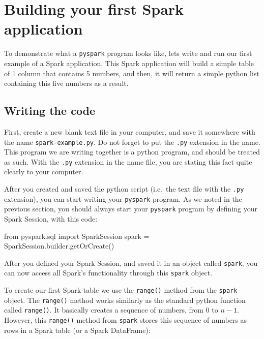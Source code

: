 \documentclass[
  11pt,
  letterpaper,
  DIV=11,
  numbers=noendperiod]{scrreprt}
\newenvironment{Shaded}{\begin{snugshade}}{\end{snugshade}}
\newcommand{\ImportTok}[1]{\textcolor[rgb]{0.00,0.46,0.62}{#1}}
\newcommand{\NormalTok}[1]{\textcolor[rgb]{0.00,0.23,0.31}{#1}}
\newcommand{\OperatorTok}[1]{\textcolor[rgb]{0.37,0.37,0.37}{#1}}
\begin{document}
\hypertarget{building-your-first-spark-application}{%
\section{Building your first Spark
application}\label{building-your-first-spark-application}}

To demonstrate what a \texttt{pyspark} program looks like, lets write
and run our first example of a Spark application. This Spark application
will build a simple table of 1 column that contains 5 numbers, and then,
it will return a simple python list containing this five numbers as a
result.

\hypertarget{writing-the-code}{%
\subsection{Writing the code}\label{writing-the-code}}

First, create a new blank text file in your computer, and save it
somewhere with the name \texttt{spark-example.py}. Do not forget to put
the \texttt{.py} extension in the name. This program we are writing
together is a python program, and should be treated as such. With the
\texttt{.py} extension in the name file, you are stating this fact quite
clearly to your computer.

After you created and saved the python script (i.e.~the text file with
the \texttt{.py} extension), you can start writing your \texttt{pyspark}
program. As we noted in the previous section, you should always start
your \texttt{pyspark} program by defining your Spark Session, with this
code:

\begin{Shaded}
\begin{Highlighting}[]
\ImportTok{from}\NormalTok{ pyspark.sql }\ImportTok{import}\NormalTok{ SparkSession}
\NormalTok{spark }\OperatorTok{=}\NormalTok{ SparkSession.builder.getOrCreate()}
\end{Highlighting}
\end{Shaded}

After you defined your Spark Session, and saved it in an object called
\texttt{spark}, you can now access all Spark's functionality through
this \texttt{spark} object.

To create our first Spark table we use the \texttt{range()} method from
the \texttt{spark} object. The \texttt{range()} method works similarly
as the standard python function called \texttt{range()}. It basically
creates a sequence of numbers, from 0 to \(n - 1\). However, this
\texttt{range()} method from \texttt{spark} stores this sequence of
numbers as rows in a Spark table (or a Spark DataFrame):
\end{document}
